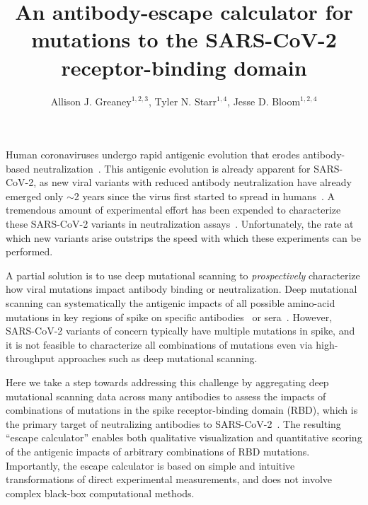 \documentclass[9pt,twocolumn,twoside]{gsajnl_modified}
\title{An antibody-escape calculator for mutations to the SARS-CoV-2 receptor-binding domain}
\author[*]{\Large Allison J. Greaney$^{1,2,3}$, Tyler N. Starr$^{1,4}$, Jesse D. Bloom$^{1,2,4}$}
\affil[1]{Basic Sciences and Computational Biology, Fred Hutchinson Cancer Center

}
\affil[2]{Department of Genome Sciences, University of Washington

}
\affil[3]{Medical Scientist Training Program, University of Washington

}
\affil[4]{Howard Hughes Medical Institute

Seattle, WA, USA
}
\begin{document}
\maketitle
\thispagestyle{firststyle}
\firstpagefootnote

\vspace{-33pt}%

\lettrine[lines=2]{\color{color2}H}{}uman coronaviruses undergo rapid antigenic evolution that erodes antibody-based neutralization~\citep{eguia2021human,kistler2021evidence}.
This antigenic evolution is already apparent for SARS-CoV-2, as new viral variants with reduced antibody neutralization have already emerged only $\sim$2 years since the virus first started to spread in humans~\citep{?}.
A tremendous amount of experimental effort has been expended to characterize these SARS-CoV-2 variants in neutralization assays~\citep{?}.
Unfortunately, the rate at which new variants arise outstrips the speed with which these experiments can be performed.

A partial solution is to use deep mutational scanning to \emph{prospectively} characterize how viral mutations impact antibody binding or neutralization.
Deep mutational scanning can systematically the antigenic impacts of all possible amino-acid mutations in key regions of spike on specific antibodies~\citep{starr2021prospective,greaney2021complete} or sera~\citep{greaney2021comprehensive}.
However, SARS-CoV-2 variants of concern typically have multiple mutations in spike, and it is not feasible to characterize all combinations of mutations even via high-throughput approaches such as deep mutational scanning.

Here we take a step towards addressing this challenge by aggregating deep mutational scanning data across many antibodies to assess the impacts of combinations of mutations in the spike receptor-binding domain (RBD), which is the primary target of neutralizing antibodies to SARS-CoV-2~\citep{?}.
The resulting ``escape calculator'' enables both qualitative visualization and quantitative scoring of the antigenic impacts of arbitrary combinations of RBD mutations.
Importantly, the escape calculator is based on simple and intuitive transformations of direct experimental measurements, and does not involve complex black-box computational methods. 
\end{document}

